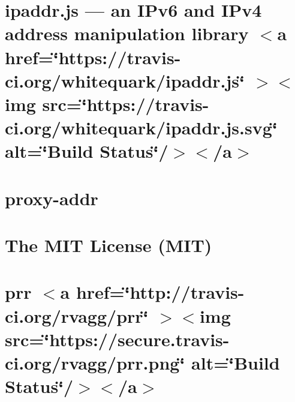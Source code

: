 \documentclass[twoside]{book}
\newcommand{\+}{\discretionary{\mbox{\scriptsize$\hookleftarrow$}}{}{}}
\begin{document}
\chapter{ipaddr.\+js — an IPv6 and IPv4 address manipulation library \texorpdfstring{$<$}{<}a href=\char`\"{}https\+://travis-\/ci.\+org/whitequark/ipaddr.\+js\char`\"{} \texorpdfstring{$>$}{>}\texorpdfstring{$<$}{<}img src=\char`\"{}https\+://travis-\/ci.\+org/whitequark/ipaddr.\+js.\+svg\char`\"{} alt=\char`\"{}\+Build Status\char`\"{}/\texorpdfstring{$>$}{>}\texorpdfstring{$<$}{<}/a\texorpdfstring{$>$}{>}}
\label{md__c___users_vaishnavi_jadhav__desktop__developer_code_mean_stack_example_client_node_modules_p5bc30451aae53e7357d92dc6451b1549}

\chapter{proxy-\/addr}
\label{md__c___users_vaishnavi_jadhav__desktop__developer_code_mean_stack_example_client_node_modules_proxy_addr__r_e_a_d_m_e}

\chapter{The MIT License (MIT)}
\label{md__c___users_vaishnavi_jadhav__desktop__developer_code_mean_stack_example_client_node_modules_prr__l_i_c_e_n_s_e}

\chapter{prr \texorpdfstring{$<$}{<}a href=\char`\"{}http\+://travis-\/ci.\+org/rvagg/prr\char`\"{} \texorpdfstring{$>$}{>}\texorpdfstring{$<$}{<}img src=\char`\"{}https\+://secure.\+travis-\/ci.\+org/rvagg/prr.\+png\char`\"{} alt=\char`\"{}\+Build Status\char`\"{}/\texorpdfstring{$>$}{>}\texorpdfstring{$<$}{<}/a\texorpdfstring{$>$}{>}}
\label{md__c___users_vaishnavi_jadhav__desktop__developer_code_mean_stack_example_client_node_modules_prr__r_e_a_d_m_e}

\end{document}
